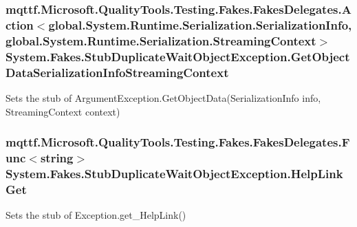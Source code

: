 \hypertarget{class_system_1_1_fakes_1_1_stub_duplicate_wait_object_exception_ab4432c536c6982ddbedb796356dce092}{
\subsubsection[{Get\-Object\-Data\-Serialization\-Info\-Streaming\-Context}]{\setlength{\rightskip}{0pt plus 5cm}mqttf.\-Microsoft.\-Quality\-Tools.\-Testing.\-Fakes.\-Fakes\-Delegates.\-Action$<$global.\-System.\-Runtime.\-Serialization.\-Serialization\-Info, global.\-System.\-Runtime.\-Serialization.\-Streaming\-Context$>$ System.\-Fakes.\-Stub\-Duplicate\-Wait\-Object\-Exception.\-Get\-Object\-Data\-Serialization\-Info\-Streaming\-Context}}\label{class_system_1_1_fakes_1_1_stub_duplicate_wait_object_exception_ab4432c536c6982ddbedb796356dce092}


Sets the stub of Argument\-Exception.\-Get\-Object\-Data(\-Serialization\-Info info, Streaming\-Context context)

\hypertarget{class_system_1_1_fakes_1_1_stub_duplicate_wait_object_exception_a0a936eb91da8306686525f615eef359b}{
\subsubsection[{Help\-Link\-Get}]{\setlength{\rightskip}{0pt plus 5cm}mqttf.\-Microsoft.\-Quality\-Tools.\-Testing.\-Fakes.\-Fakes\-Delegates.\-Func$<$string$>$ System.\-Fakes.\-Stub\-Duplicate\-Wait\-Object\-Exception.\-Help\-Link\-Get}}\label{class_system_1_1_fakes_1_1_stub_duplicate_wait_object_exception_a0a936eb91da8306686525f615eef359b}


Sets the stub of Exception.\-get\-\_\-\-Help\-Link()

